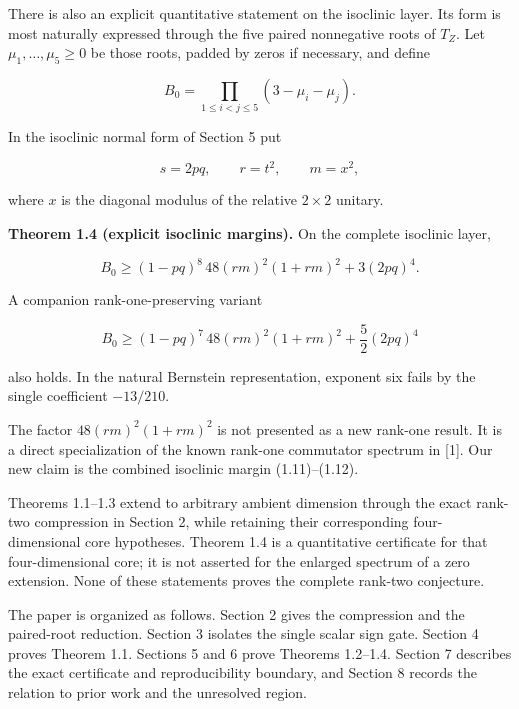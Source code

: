 \documentclass[11pt]{article}
\begin{document}
There is also an explicit quantitative statement on the isoclinic layer. Its form is most naturally expressed through the five paired nonnegative roots of $T_Z$. Let $\mu_1,\ldots,\mu_5\ge0$ be those roots, padded by zeros if necessary, and define

\begin{equation}
B_0=\prod_{1\le i<j\le5}(3-\mu_i-\mu_j).
\tag{1.9}
\end{equation}

In the isoclinic normal form of Section 5 put

\begin{equation}
s=2pq,\qquad r=t^2,\qquad m=x^2,
\tag{1.10}
\end{equation}

where $x$ is the diagonal modulus of the relative $2\times2$ unitary.

\textbf{Theorem 1.4 (explicit isoclinic margins).} On the complete isoclinic layer,

\begin{equation}
B_0\ge
(1-pq)^8\,48(rm)^2(1+rm)^2+3(2pq)^4.
\tag{1.11}
\end{equation}

A companion rank-one-preserving variant

\begin{equation}
B_0\ge
(1-pq)^7\,48(rm)^2(1+rm)^2+\frac52(2pq)^4
\tag{1.12}
\end{equation}

also holds. In the natural Bernstein representation, exponent six fails by the single coefficient $-13/210$.

The factor $48(rm)^2(1+rm)^2$ is not presented as a new rank-one result. It is a direct specialization of the known rank-one commutator spectrum in [1]. Our new claim is the combined isoclinic margin (1.11)--(1.12).

Theorems 1.1--1.3 extend to arbitrary ambient dimension through the exact rank-two compression in Section 2, while retaining their corresponding four-dimensional core hypotheses. Theorem 1.4 is a quantitative certificate for that four-dimensional core; it is not asserted for the enlarged spectrum of a zero extension. None of these statements proves the complete rank-two conjecture.

The paper is organized as follows. Section 2 gives the compression and the paired-root reduction. Section 3 isolates the single scalar sign gate. Section 4 proves Theorem 1.1. Sections 5 and 6 prove Theorems 1.2--1.4. Section 7 describes the exact certificate and reproducibility boundary, and Section 8 records the relation to prior work and the unresolved region.
\end{document}
